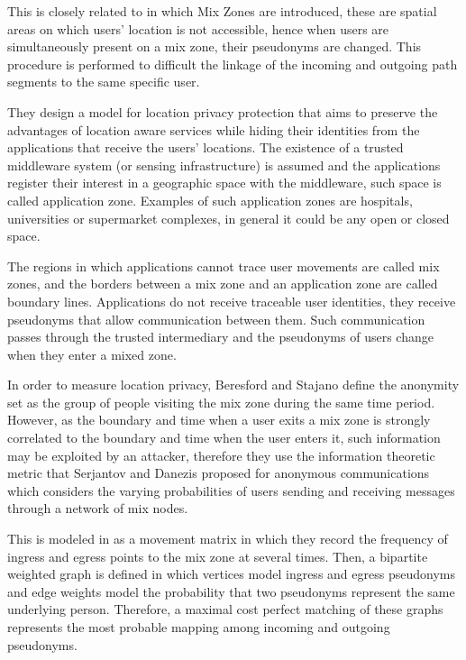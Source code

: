 \documentclass{llncs}
\begin{document}
This is closely related to \cite{Beresford2003} in which Mix Zones are introduced, these are spatial areas on which users' location is not accessible, hence when users are simultaneously present on a mix zone, their pseudonyms are changed. This procedure is performed to difficult the linkage of the incoming and outgoing path segments to the same specific user.

They design a model for location privacy protection that aims to preserve the advantages of location aware services while hiding their identities from the applications that receive the users' locations.
The existence of a trusted middleware system (or sensing infrastructure) is assumed and the applications register their interest in a geographic space with the middleware, such space is called application zone. Examples of such application zones are hospitals, universities or supermarket complexes, in general it could be any open or closed space.

The regions in which applications cannot trace user movements are called mix zones, and the borders between a mix zone and an application zone are called boundary lines.
Applications do not receive traceable user identities, they receive pseudonyms that allow communication between them. Such communication passes through the trusted intermediary and the pseudonyms of users change when they enter a mixed zone.


In order to measure location privacy, Beresford and Stajano \cite{Beresford04mixzones} define the anonymity set as the group of people visiting the mix zone during the same time period. However, as the boundary and time when a user exits a mix zone is strongly correlated to the boundary and time when the user enters it, such information may be exploited by an attacker, therefore they use the information theoretic metric that Serjantov and Danezis \cite{Serjantov2002} proposed for anonymous communications which considers the varying probabilities of users sending and receiving messages through a network of mix nodes.


This is modeled in \cite{Beresford04mixzones} as a movement matrix in which they record the frequency of ingress and egress points to the mix zone at several times.
Then, a bipartite weighted graph is defined in which vertices model ingress and egress pseudonyms and edge weights
model the probability that two pseudonyms represent the same underlying person. Therefore, a maximal cost perfect matching of these graphs represents the most probable mapping among incoming and outgoing pseudonyms.
\end{document}
